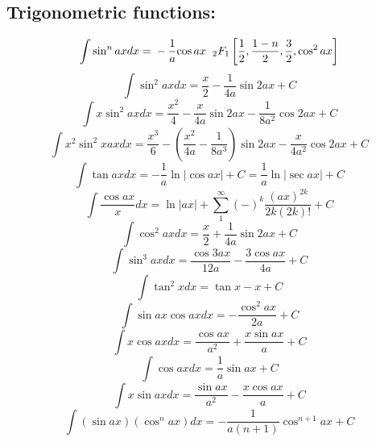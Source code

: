 \documentclass[12pt,a4paper]{article}
\begin{document}
	\subsection*{Trigonometric functions:}
	\begin{equation}
		\int \sin^n ax dx =
		\nonumber \\ 
		-\frac{1}{a}{\cos ax} \hspace{2mm}{_2F_1}\left[
		\frac{1}{2}, \frac{1-n}{2}, \frac{3}{2}, \cos^2 ax
		\right]
	\end{equation}
	\begin{equation}
		\int \sin ^2 ax dx = \frac{x}{2} - \frac{1}{4a} \sin 2ax + C
	\end{equation}
	\begin{equation}
		\int x \sin ^2 ax dx = \frac{x^2}{4} - \frac{x}{4a} \sin 2ax - \frac{1}{8a^2} \cos 2ax + C
	\end{equation}
	\begin{equation}
		\int x^2 \sin^2 x ax dx = \frac{x^3}{6} - (\frac{x^2}{4a} - \frac{1}{8a^3})\sin 2ax - \frac{x}{4a^2} \cos 2ax +C
	\end{equation}
	\begin{equation}
		\int \tan ax dx = - \frac{1}{a} \ln |\cos ax| + C = \frac{1}{a} \ln |\sec ax | +C
	\end{equation}
	\begin{equation}
		\int \frac{\cos ax}{x} dx = \ln |ax| + \sum_{1}^{\infty} (-)^k \frac{(ax)^{2k}}{2k (2k)!} +C
	\end{equation}
	\begin{equation}
		\int \cos ^2 ax dx = \frac{x}{2} + \frac{1}{4a} \sin 2ax + C
	\end{equation}
	\begin{equation}
		\int \sin^3 ax dx = \frac{\cos 3ax}{12a} - \frac{3 \cos ax}{4a} + C
	\end{equation}
	\begin{equation}
		\int \tan^2 x dx = \tan x -x +C
	\end{equation}
	\begin{equation}
		\int \sin ax \cos ax dx = - \frac{\cos^2 ax}{2a} + C
	\end{equation}
	\begin{equation}
		\int x \cos ax dx = \frac{\cos ax}{a^2} + \frac{x \sin ax}{a} + C
	\end{equation}
	\begin{equation}
		\int \cos ax dx = \frac{1}{a} \sin ax + C
	\end{equation}
	\begin{equation}
		\int x \sin ax dx = \frac{\sin ax }{a^2} -\frac{x \cos ax }{a} + C
	\end{equation}
	\begin{equation}
		\int (\sin ax) (\cos^n ax) dx = - \frac{1}{a ( n + 1)} \cos ^{n+1} ax + C
	\end{equation}
	
\end{document}
